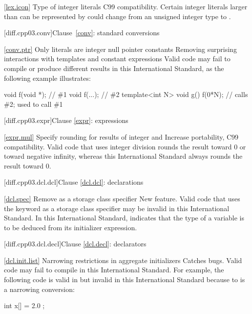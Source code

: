 \ref{lex.icon}
\change Type of integer literals
\rationale C99 compatibility.
\effect
Certain integer literals larger than can be represented by  could
change from an unsigned integer type to .

[diff.cpp03.conv]{Clause~\ref{conv}: standard conversions}

\ref{conv.ptr}
\change Only literals are integer null pointer constants
\rationale Removing surprising interactions with templates and constant
expressions
\effect Valid \CppIII code may fail to compile or produce different results in
this International Standard, as the following example illustrates:

\begin{codeblock}
void f(void *);  // \#1
void f(...);     // \#2
template<int N> void g() {
  f(0*N);        // calls \#2; used to call \#1
}
\end{codeblock}

[diff.cpp03.expr]{Clause \ref{expr}: expressions}

\ref{expr.mul}
\change Specify rounding for results of integer \tcode{/} and \tcode{\%}
\rationale Increase portability, C99 compatibility.
\effect
Valid \CppIII code that uses integer division rounds the result toward 0 or
toward negative infinity, whereas this International Standard always rounds
the result toward 0.

[diff.cpp03.dcl.dcl]{Clause \ref{dcl.dcl}: declarations}

\ref{dcl.spec}
\change Remove  as a storage class specifier
\rationale New feature.
\effect
Valid \CppIII code that uses the keyword  as a storage class
specifier may be invalid in this International Standard. In this International
Standard,  indicates that the type of a variable is to be deduced
from its initializer expression.

[diff.cpp03.dcl.decl]{Clause \ref{dcl.decl}: declarators}

\ref{dcl.init.list}
\change Narrowing restrictions in aggregate initializers
\rationale Catches bugs.
\effect
Valid \CppIII code may fail to compile in this International Standard. For
example, the following code is valid in \CppIII but invalid in this
International Standard because  to  is a narrowing
conversion:

\begin{codeblock}
int x[] = { 2.0 };
\end{codeblock}


